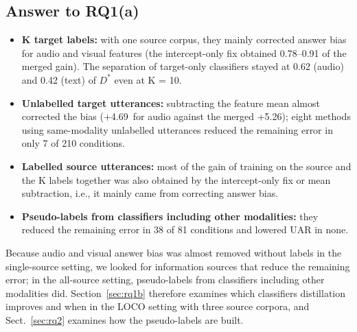 \subsection{Answer to RQ1(a)}
\begin{itemize}
\item \textbf{K target labels:} with one source corpus, they mainly corrected answer bias for audio and visual features (the intercept-only fix obtained 0.78--0.91 of the merged gain). The separation of target-only classifiers stayed at 0.62 (audio) and 0.42 (text) of $D^{*}$ even at K = 10.
\item \textbf{Unlabelled target utterances:} subtracting the feature mean almost corrected the bias (+4.69\pt\ for audio against the merged +5.26\pt); eight methods using same-modality unlabelled utterances reduced the remaining error in only 7 of 210 conditions.
\item \textbf{Labelled source utterances:} most of the gain of training on the source and the K labels together was also obtained by the intercept-only fix or mean subtraction, i.e., it mainly came from correcting answer bias.
\item \textbf{Pseudo-labels from classifiers including other modalities:} they reduced the remaining error in 38 of 81 conditions and lowered UAR in none.
\end{itemize}
Because audio and visual answer bias was almost removed without labels in the single-source setting, we looked for information sources that reduce the remaining error; in the all-source setting, pseudo-labels from classifiers including other modalities did. Section~\ref{sec:rq1b} therefore examines which classifiers distillation improves and when in the LOCO setting with three source corpora, and Sect.~\ref{sec:rq2} examines how the pseudo-labels are built.
